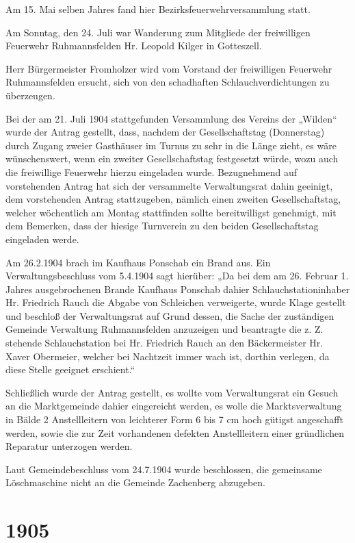 \documentclass[12pt,a4paper]{book}
\begin{document}
Am 15. Mai selben Jahres fand hier Bezirksfeuerwehrversammlung statt.

Am Sonntag, den 24. Juli war Wanderung zum Mitgliede der freiwilligen Feuerwehr
Ruhmannsfelden Hr. Leopold Kilger in Gotteszell.

Herr Bürgermeister Fromholzer wird vom Vorstand der freiwilligen Feuerwehr
Ruhmannsfelden ersucht, sich von den schadhaften Schlauchverdichtungen zu
überzeugen.

Bei der am 21. Juli 1904 stattgefunden Versammlung des Vereins der „Wilden“
wurde der Antrag gestellt, dass, nachdem der Gesellschaftstag (Donnerstag) durch
Zugang zweier Gasthäuser im Turnus zu sehr in die Länge zieht, es wäre
wünschenswert, wenn ein zweiter Gesellschaftstag festgesetzt würde, wozu auch
die freiwillige Feuerwehr hierzu eingeladen wurde. Bezugnehmend auf vorstehenden
Antrag hat sich der versammelte Verwaltungsrat dahin geeinigt, dem vorstehenden
Antrag stattzugeben, nämlich einen zweiten Gesellschaftstag, welcher wöchentlich
am Montag stattfinden sollte bereitwilligst genehmigt, mit dem Bemerken, dass
der hiesige Turnverein zu den beiden Gesellschaftstag eingeladen werde.

Am 26.2.1904 brach im Kaufhaus Ponschab ein Brand aus. Ein Verwaltungsbeschluss
vom 5.4.1904 sagt hierüber: „Da bei dem am 26. Februar 1. Jahres ausgebrochenen
Brande Kaufhaus Ponschab dahier Schlauchstationinhaber Hr. Friedrich Rauch die
Abgabe von Schleichen verweigerte, wurde Klage gestellt und beschloß der
Verwaltungsrat auf Grund dessen, die Sache der zuständigen Gemeinde Verwaltung
Ruhmannsfelden anzuzeigen und beantragte die z. Z. stehende Schlauchstation bei
Hr. Friedrich Rauch an den Bäckermeister Hr. Xaver Obermeier, welcher bei
Nachtzeit immer wach ist, dorthin verlegen, da diese Stelle geeignet erschient.“

Schließlich wurde der Antrag gestellt, es wollte vom Verwaltungsrat ein Gesuch
an die Marktgemeinde dahier eingereicht werden, es wolle die Marktsverwaltung in
Bälde 2 Anstellleitern von leichterer Form 6 bis 7 cm hoch gütigst angeschafft
werden, sowie die zur Zeit vorhandenen defekten Anstellleitern einer gründlichen
Reparatur unterzogen werden.

Laut Gemeindebeschluss vom 24.7.1904 wurde beschlossen, die gemeinsame
Löschmaschine nicht an die Gemeinde Zachenberg abzugeben.

\section*{1905}
\end{document}

